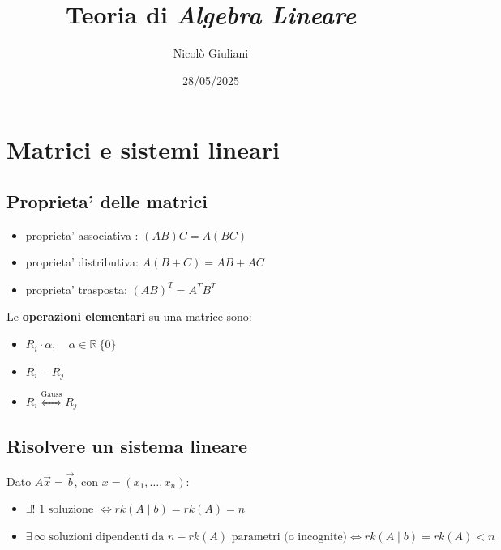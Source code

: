 \documentclass[10pt]{extarticle}
\title{Teoria di \textit{Algebra Lineare}}
\author{Nicolò Giuliani}
\date{28/05/2025}
\begin{document}
\maketitle
\section{Matrici e sistemi lineari}
\subsection{Proprieta' delle matrici}
\begin{itemize}
    \item proprieta' associativa : $(AB)C=A(BC)$
    \item proprieta' distributiva: $A(B+C)=AB+AC$
    \item proprieta' trasposta: $(AB)^T=A^TB^T$
\end{itemize}
Le \textbf{operazioni elementari} su una matrice sono:
\begin{itemize}
    \item $R_i \cdot \alpha, \quad \alpha \in \mathbb{R}\ \{0\}$
    \item $R_i - R_j$
    \item $R_i \overset{\text{Gauss}}{\iff} R_j$
\end{itemize}
\subsection{Risolvere un sistema lineare}
Dato $A\vec{x}=\vec{b}$, con $x=(x_1,\dots,x_n)$:
\begin{itemize}
    \item $\exists! \text{ 1 soluzione } \iff rk(A \mid b)=rk(A)=n$
    \item $\exists \, \infty \text{ soluzioni dipendenti da $n-rk(A)$ parametri (o incognite)} \iff rk(A \mid b) = rk (A) < n$
\end{itemize}
\end{document}

